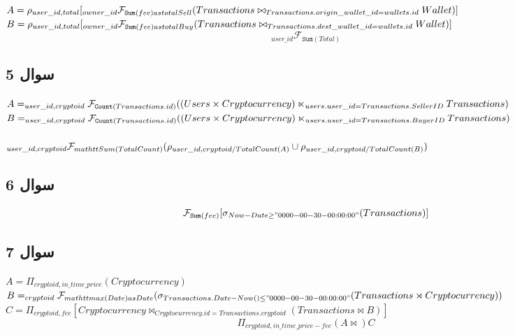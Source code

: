 \documentclass{book}
\begin{document}
        $A = \rho_{user\_id, total}[ _{owner\_id} \mathcal{F}_{\mathtt{Sum}(fee) as totalSell} \newline( 
            Transactions \bowtie_{Transactions.origin\_wallet\_id = wallets.id} Wallet
        )]$\\
        $B = \rho_{user\_id, total}[ _{owner\_id} \mathcal{F}_{\mathtt{Sum}(fee) as totalBuy} \newline( 
            Transactions \bowtie_{Transactions.dest\_wallet\_id = wallets.id} Wallet
        )]$
        $$_{user\_id}\mathcal{F}_{\mathtt{Sum}(Total)}$$


        \subsection{سوال 5}

        $A = _{user\_id, cryptoid} \mathcal{F}_{\mathtt{Count}(Transactions.id)}(\\(Users \times Cryptocurrency) \ltimes_{users.user\_id = Transactions.SellerID} \\Transactions)$\\

        $B = _{user\_id, cryptoid} \mathcal{F}_{\mathtt{Count}(Transactions.id)}(\\(Users \times Cryptocurrency) \ltimes_{users.user\_id = Transactions.BuyerID}\\ Transactions)$\\
        \quad\\
        $_{user\_id, cryptoid} \mathcal{F}_{mathtt{Sum}(TotalCount)} (\\\rho_{user\_id, cryptoid/ TotalCount(A)} \cup \rho_{user\_id, cryptoid/ TotalCount(B)} )$

        \subsection{سوال 6}
        $$\mathcal{F}_{\mathtt{Sum}(fee)}[\sigma_{Now-Date \geq "0000-00-30-00:00:00"}(Transactions)]$$

        \subsection{سوال 7}

        \begin{latin}
            
            $A= \Pi_{cryptoid, in\_time\_price} (Cryptocurrency)$\\
            $B=_{cryptoid} \mathcal{F}_{mathtt{max}(Date) as Date} (\sigma_{Transactions.Date - Now() \leq "0000-00-30-00:00:00"}\\(Transactions \rtimes Cryptocurrency))$\\
            $C = \Pi_{cryptoid,fee} [Cryptocurrency \bowtie_{Cryptocurrency.id = Transactions.cryptoid} (Transactions \bowtie B)]$\\
            $$\Pi_{cryptoid, in\_time\_price - fee} (A \bowtie) C$$
        \end{latin}
\end{document}

